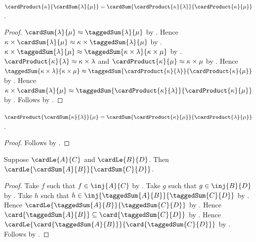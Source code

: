 \begin{proposition}\label{cardinal_product_distributes_over_sum}
    $\cardProduct{\kappa}{\cardSum{\lambda}{\mu}}
        =\cardSum{\cardProduct{\kappa}{\lambda}}
            {\cardProduct{\kappa}{\mu}}$.
\end{proposition}
\begin{proof}
    $\cardSum{\lambda}{\mu}\approx\taggedSum{\lambda}{\mu}$
        by .
    Hence $\kappa\times\cardSum{\lambda}{\mu}
        \approx\kappa\times\taggedSum{\lambda}{\mu}$
        by .
    $\kappa\times\taggedSum{\lambda}{\mu}
        \approx\taggedSum{\kappa\times\lambda}{\kappa\times\mu}$
        by .
    $\cardProduct{\kappa}{\lambda}\approx\kappa\times\lambda$ and
        $\cardProduct{\kappa}{\mu}\approx\kappa\times\mu$
        by .
    Hence $\taggedSum{\kappa\times\lambda}{\kappa\times\mu}
        \approx
        \taggedSum{\cardProduct{\kappa}{\lambda}}
            {\cardProduct{\kappa}{\mu}}$
        by .
    Hence $\kappa\times\cardSum{\lambda}{\mu}
        \approx
        \taggedSum{\cardProduct{\kappa}{\lambda}}
            {\cardProduct{\kappa}{\mu}}$
        by .
    Follows by
        .
\end{proof}

\begin{corollary}\label{cardinal_product_distributes_over_sum_right}
    $\cardProduct{\cardSum{\kappa}{\lambda}}{\mu}
        =\cardSum{\cardProduct{\kappa}{\mu}}
            {\cardProduct{\lambda}{\mu}}$.
\end{corollary}
\begin{proof}
    Follows by
        .
\end{proof}

\begin{theorem}\label{cardinal_sum_monotone}
    Suppose $\cardLe{A}{C}$ and $\cardLe{B}{D}$.
    Then $\cardLe{\cardSum{A}{B}}{\cardSum{C}{D}}$.
\end{theorem}
\begin{proof}
    Take $f$ such that $f\in\inj{A}{C}$ by .
    Take $g$ such that $g\in\inj{B}{D}$ by .
    Take $h$ such that
        $h\in\inj{\taggedSum{A}{B}}{\taggedSum{C}{D}}$
        by .
    Hence $\cardLe{\taggedSum{A}{B}}{\taggedSum{C}{D}}$
        by .
    Hence $\card{\taggedSum{A}{B}}
        \subseteq\card{\taggedSum{C}{D}}$
        by .
    Hence $\cardLe{\card{\taggedSum{A}{B}}}
        {\card{\taggedSum{C}{D}}}$
        by .
    Follows by .
\end{proof}

